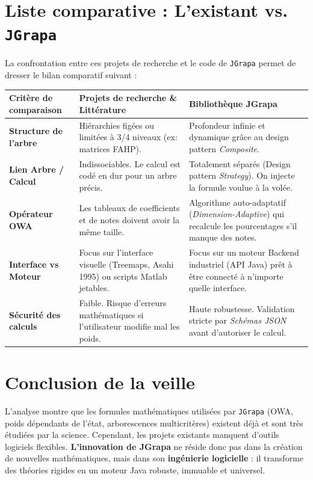 \documentclass[12pt,a4paper]{article}
\begin{document}
\section{Liste comparative : L'existant vs. \texttt{JGrapa}}

La confrontation entre ces projets de recherche et le code de \texttt{JGrapa} permet de dresser le bilan comparatif suivant :

\vspace{0.5cm}
\begin{tabular}{p{4.5cm} p{5cm} p{5.5cm}}
\toprule
\textbf{Critère de comparaison} & \textbf{Projets de recherche \& Littérature} & \textbf{Bibliothèque JGrapa} \\
\midrule
\textbf{Structure de l'arbre} & Hiérarchies figées ou limitées à 3/4 niveaux (ex: matrices FAHP). & Profondeur infinie et dynamique grâce au design pattern \textit{Composite}. \\
\addlinespace
\textbf{Lien Arbre / Calcul} & Indissociables. Le calcul est codé en dur pour un arbre précis. & Totalement séparés (Design pattern \textit{Strategy}). On injecte la formule voulue à la volée. \\
\addlinespace
\textbf{Opérateur OWA} & Les tableaux de coefficients et de notes doivent avoir la même taille. & Algorithme auto-adaptatif (\textit{Dimension-Adaptive}) qui recalcule les pourcentages s'il manque des notes. \\
\addlinespace
\textbf{Interface vs Moteur} & Focus sur l'interface visuelle (Treemaps, Asahi 1995) ou scripts Matlab jetables. & Focus sur un moteur Backend industriel (API Java) prêt à être connecté à n'importe quelle interface. \\
\addlinespace
\textbf{Sécurité des calculs} & Faible. Risque d'erreurs mathématiques si l'utilisateur modifie mal les poids. & Haute robustesse. Validation stricte par \textit{Schémas JSON} avant d'autoriser le calcul. \\
\bottomrule
\end{tabular}
\vspace{0.5cm}

\section{Conclusion de la veille}
L'analyse montre que les formules mathématiques utilisées par \texttt{JGrapa} (OWA, poids dépendants de l'état, arborescences multicritères) existent déjà et sont très étudiées par la science. Cependant, les projets existants manquent d'outils logiciels flexibles. \textbf{L'innovation de JGrapa} ne réside donc pas dans la création de nouvelles mathématiques, mais dans son \textbf{ingénierie logicielle} : il transforme des théories rigides en un moteur Java robuste, immuable et universel.
\end{document}
